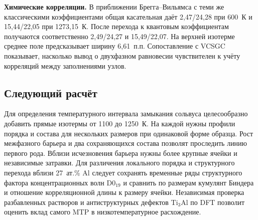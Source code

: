 \textbf{Химические корреляции.} В приближении Брегга--Вильямса
с теми же классическими коэффициентами общая касательная даёт
2,47/24,28 при 600~К и 15,44/22,05 при 1273,15~К. После перехода к
квантовым коэффициентам получаются соответственно 2,49/24,27 и
15,49/22,07. На верхней изотерме среднее поле предсказывает ширину
6,61~п.п. Сопоставление с VCSGC показывает, насколько вывод о двухфазном
равновесии чувствителен к учёту корреляций между заполнениями узлов.

\subsection*{Следующий расчёт}
Для определения температурного интервала замыкания сольвуса целесообразно
добавить прямые изотермы от 1100 до 1250~К. На каждой нужны профили
порядка и состава для нескольких размеров при одинаковой форме образца.
Рост межфазного барьера и два сохраняющихся состава позволят проследить
линию первого рода. Вблизи исчезновения барьера нужны более крупные
ячейки и независимые затравки. Для различения локального порядка и
структурного перехода вблизи 27~ат.\% Al следует сохранять временные ряды
структурного фактора концентрационных волн D0$_{19}$ и сравнить по размерам
кумулянт Биндера и отношение корреляционной длины к размеру ячейки. Независимая
проверка разбавленных растворов и антиструктурных дефектов Ti$_3$Al по DFT
позволит оценить вклад самого MTP в низкотемпературное расхождение.

\medskip{}
